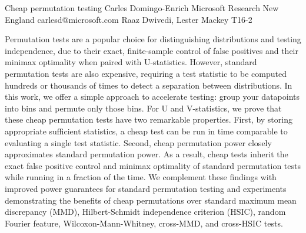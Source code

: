 \begin{talk}
  {Cheap permutation testing}%
  {Carles Domingo-Enrich}%
  {Microsoft Research New England}%
  {carlesd@microsoft.com}%
  {Raaz Dwivedi, Lester Mackey}%
  {T16-2}%
			
Permutation tests are a popular choice for distinguishing distributions and testing independence, due to their exact, finite-sample control of false positives and their minimax optimality when paired with U-statistics. However, standard permutation tests are also expensive, requiring a test statistic to be computed hundreds or thousands of times to detect a separation between distributions. In this work, we offer a simple approach to accelerate testing: group your datapoints into bins and permute only those bins. For U and V-statistics, we prove that these cheap permutation tests have two remarkable properties. First, by storing appropriate sufficient statistics, a cheap test can be run in time comparable to evaluating a single test statistic. Second, cheap permutation power closely approximates standard permutation power. As a result, cheap tests inherit the exact false positive control and minimax optimality of standard permutation tests while running in a fraction of the time. We complement these findings with improved power guarantees for standard permutation testing and experiments demonstrating the benefits of cheap permutations over standard maximum mean discrepancy (MMD), Hilbert-Schmidt independence criterion (HSIC), random Fourier feature, Wilcoxon-Mann-Whitney, cross-MMD, and cross-HSIC tests.



\end{talk}


